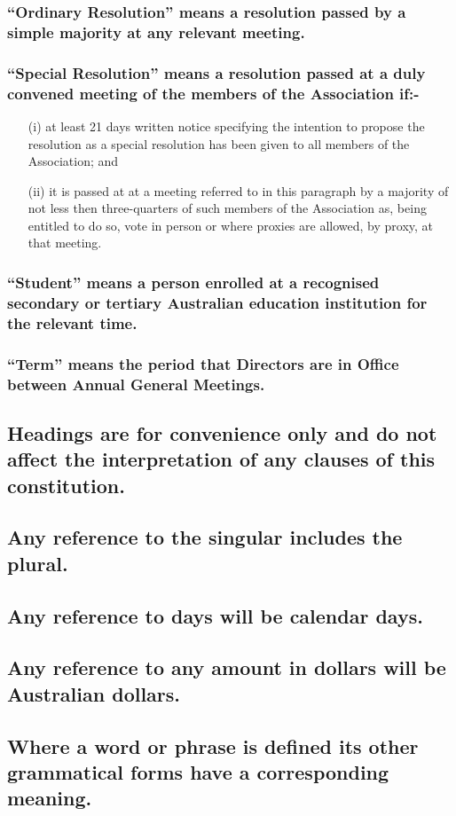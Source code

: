\documentclass{article}
\newenvironment{subs}
  {\adjustwidth{2em}{0pt}}
  {\endadjustwidth}
\begin{document}
\begin{subs}
\begin{subs}
\subsubsection{``Ordinary Resolution'' means a resolution passed by a simple majority at any relevant meeting.} 
\subsubsection{``Special Resolution'' means a resolution passed at a duly convened meeting of the members of the Association if:-}
\begin{subs}
\begin{itemize}
\item[(i)] at least 21 days  written notice specifying the intention to propose the resolution as a special resolution has been given to all members of the Association; and
\item[(ii)] it is passed at at a meeting referred to in this paragraph by a majority of not less then three-quarters of such members of the Association as, being entitled to do so, vote in person or where proxies are allowed, by proxy, at that meeting.
\end{itemize}
\end{subs}
\subsubsection{``Student'' means a person enrolled at a recognised secondary or tertiary Australian education institution for the relevant time.}
\subsubsection{``Term'' means the period that Directors are in Office between Annual General Meetings.}
\end{subs}
\subsection{Headings are for convenience only and do not affect the interpretation of any clauses of this constitution.}
\subsection{Any reference to the singular includes the plural.}
\subsection{Any reference to days will be calendar days.}
\subsection{Any reference to any amount in dollars will be Australian dollars.}
\subsection{Where a word or phrase is defined its other grammatical forms have a corresponding meaning.}
\end{subs}
\end{document}
